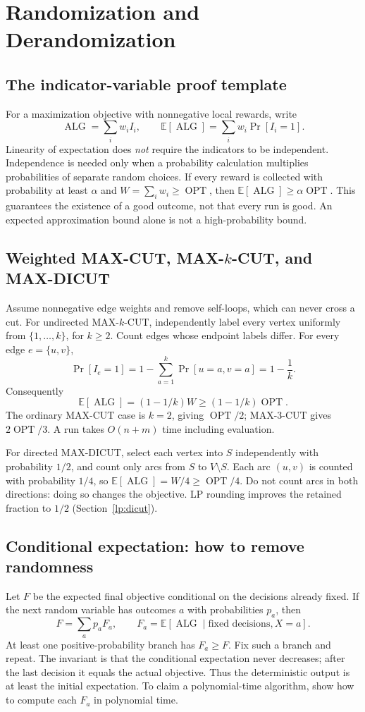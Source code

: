 \documentclass[10pt]{article}
\theoremstyle{definition}
\newcommand{\OPT}{\operatorname{OPT}}
\newcommand{\ALG}{\operatorname{ALG}}
\begin{document}
\clearpage

\section{Randomization and Derandomization}\label{ra:main}

\subsection{The indicator-variable proof template}
For a maximization objective with nonnegative local rewards, write
\[
  \ALG=\sum_i w_i I_i,\qquad
  \mathbb E[\ALG]=\sum_i w_i\Pr[I_i=1].
\]
Linearity of expectation does \emph{not} require the indicators to be
independent. Independence is needed only when a probability calculation
multiplies probabilities of separate random choices. If every reward is
collected with probability at least $\alpha$ and
$W=\sum_iw_i\ge\OPT$, then $\mathbb E[\ALG]\ge\alpha\OPT$.
This guarantees the existence of a good outcome, not that every run is good.
An expected approximation bound alone is not a high-probability bound.

\subsection{Weighted MAX-CUT, MAX-\texorpdfstring{$k$}{k}-CUT, and MAX-DICUT}
Assume nonnegative edge weights and remove self-loops, which can never cross
a cut. For undirected MAX-$k$-CUT, independently label every vertex uniformly
from $\{1,\ldots,k\}$, for $k\ge2$. Count edges whose endpoint labels differ.
For every edge $e=\{u,v\}$,
\[
  \Pr[I_e=1]=1-\sum_{a=1}^k\Pr[u=a,v=a]=1-\frac1k.
\]
Consequently
\[
  \mathbb E[\ALG]=(1-1/k)W\ge(1-1/k)\OPT.
\]
The ordinary MAX-CUT case is $k=2$, giving $\OPT/2$; MAX-3-CUT gives
$2\OPT/3$. A run takes $O(n+m)$ time including evaluation.

For directed MAX-DICUT, select each vertex into $S$ independently with
probability $1/2$, and count only arcs from $S$ to $V\setminus S$.
Each arc $(u,v)$ is counted with probability $1/4$, so
$\mathbb E[\ALG]=W/4\ge\OPT/4$.
Do not count arcs in both directions: doing so changes the objective.
LP rounding improves the retained fraction to $1/2$
(Section~\ref{lp:dicut}).

\subsection{Conditional expectation: how to remove randomness}\label{ra:conditional}
Let $F$ be the expected final objective conditional on the decisions already
fixed. If the next random variable has outcomes $a$ with probabilities $p_a$,
then
\[
  F=\sum_a p_a F_a,\qquad
  F_a=\mathbb E[\ALG\mid\text{fixed decisions},X=a].
\]
At least one positive-probability branch has $F_a\ge F$. Fix such a branch and
repeat. The invariant is that the conditional expectation never decreases;
after the last decision it equals the actual objective. Thus the deterministic
output is at least the initial expectation. To claim a polynomial-time
algorithm, show how to compute each $F_a$ in polynomial time.
\end{document}
